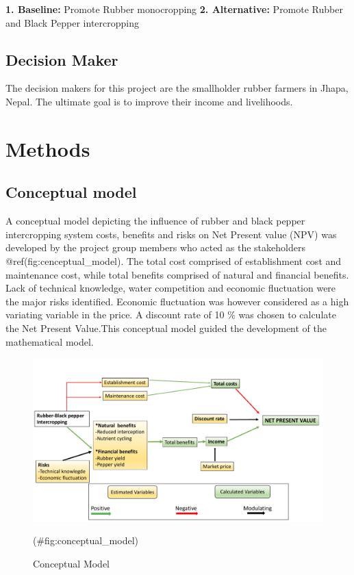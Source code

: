 \documentclass[
]{article}
\begin{document}
\textbf{1. Baseline:} Promote Rubber monocropping
\textbf{2. Alternative:} Promote Rubber and Black Pepper intercropping

\hypertarget{decision-maker}{%
\subsection{Decision Maker}\label{decision-maker}}

The decision makers for this project are the smallholder rubber farmers in Jhapa, Nepal. The ultimate goal is to improve their income and livelihoods.

\hypertarget{methods}{%
\section{\texorpdfstring{\textbf{Methods}}{Methods}}\label{methods}}

\hypertarget{conceptual-model}{%
\subsection{Conceptual model}\label{conceptual-model}}

A conceptual model depicting the influence of rubber and black pepper intercropping system costs, benefits and risks on Net Present value (NPV) was developed by the project group members who acted as the stakeholders @ref(fig:cenceptual\_model). The total cost comprised of establishment cost and maintenance cost, while total benefits comprised of natural and financial benefits. Lack of technical knowledge, water competition and economic fluctuation were the major risks identified. Economic fluctuation was however considered as a high variating variable in the price. A discount rate of 10 \% was chosen to calculate the Net Present Value.This conceptual model guided the development of the mathematical model.

\begin{figure}

{\centering \includegraphics[width=1\linewidth]{results/conceptual_model} 

}

\caption{Conceptual Model}(\#fig:conceptual_model)
\end{figure}
\end{document}
